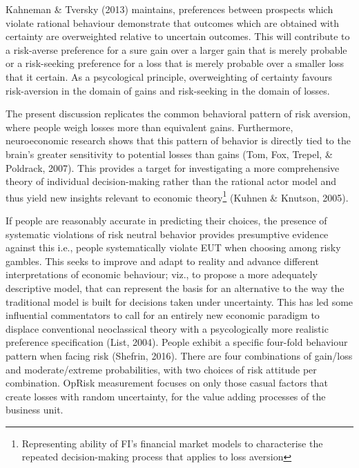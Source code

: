 \documentclass{DissertateUSU}
\begin{document}
Kahneman \& Tversky (2013) maintains, preferences between prospects
which violate rational behaviour demonstrate that outcomes which are
obtained with certainty are overweighted relative to uncertain outcomes.
This will contribute to a risk-averse preference for a sure gain over a
larger gain that is merely probable or a risk-seeking preference for a
loss that is merely probable over a smaller loss that it certain. As a
psycological principle, overweighting of certainty favours risk-aversion
in the domain of gains and risk-seeking in the domain of losses.\medskip

The present discussion replicates the common behavioral pattern of risk
aversion, where people weigh losses more than equivalent gains.
Furthermore, neuroeconomic research shows that this pattern of behavior
is directly tied to the brain's greater sensitivity to potential losses
than gains (Tom, Fox, Trepel, \& Poldrack, 2007). This provides a target
for investigating a more comprehensive theory of individual
decision-making rather than the rational actor model and thus yield new
insights relevant to economic
theory\footnote{Representing ability of FI's financial market models to characterise the repeated decision-making process that applies to loss aversion}
(Kuhnen \& Knutson, 2005).\medskip  

If people are reasonably accurate in predicting their choices, the
presence of systematic violations of risk neutral behavior provides
presumptive evidence against this i.e., people systematically violate
EUT when choosing among risky gambles. This seeks to improve and adapt
to reality and advance different interpretations of economic behaviour;
viz., to propose a more adequately descriptive model, that can represent
the basis for an alternative to the way the traditional model is built
for decisions taken under uncertainty. This has led some influential
commentators to call for an entirely new economic paradigm to displace
conventional neoclassical theory with a psycologically more realistic
preference specification (List, 2004). People exhibit a specific
four-fold behaviour pattern when facing risk (Shefrin, 2016). There are
four combinations of gain/loss and moderate/extreme probabilities, with
two choices of risk attitude per combination. OpRisk measurement focuses
on only those casual factors that create losses with random uncertainty,
for the value adding processes of the business unit.

\singlespacing

\FloatBarrier
\newpage
{}
\fancyhead[R]{\thepage}
\fancyfoot[C]{}
\end{document}
